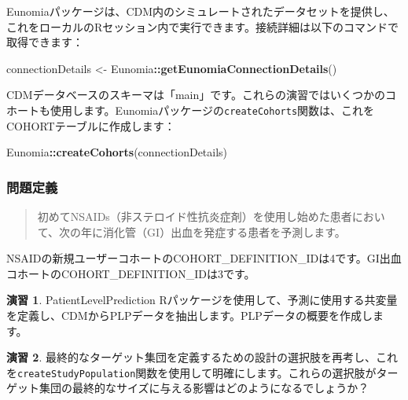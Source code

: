 \documentclass[
  11pt]{book}
\newenvironment{Shaded}{\begin{snugshade}}{\end{snugshade}}
\newcommand{\FunctionTok}[1]{\textcolor[rgb]{0.13,0.29,0.53}{\textbf{#1}}}
\newcommand{\NormalTok}[1]{#1}
\newcommand{\OtherTok}[1]{\textcolor[rgb]{0.56,0.35,0.01}{#1}}
\newcommand{\SpecialCharTok}[1]{\textcolor[rgb]{0.81,0.36,0.00}{\textbf{#1}}}
\theoremstyle{definition}
\theoremstyle{definition}
\theoremstyle{definition}
\newtheorem{exercise}{演習}[chapter]
\theoremstyle{definition}
\theoremstyle{remark}
\begin{document}
Eunomiaパッケージは、CDM内のシミュレートされたデータセットを提供し、これをローカルのRセッション内で実行できます。接続詳細は以下のコマンドで取得できます：

\begin{Shaded}
\begin{Highlighting}[]
\NormalTok{connectionDetails }\OtherTok{\textless{}{-}}\NormalTok{ Eunomia}\SpecialCharTok{::}\FunctionTok{getEunomiaConnectionDetails}\NormalTok{()}
\end{Highlighting}
\end{Shaded}

CDMデータベースのスキーマは「main」です。これらの演習ではいくつかのコホートも使用します。Eunomiaパッケージの\texttt{createCohorts}関数は、これをCOHORTテーブルに作成します：

\begin{Shaded}
\begin{Highlighting}[]
\NormalTok{Eunomia}\SpecialCharTok{::}\FunctionTok{createCohorts}\NormalTok{(connectionDetails)}
\end{Highlighting}
\end{Shaded}

\subsubsection*{問題定義}\label{ux554fux984cux5b9aux7fa9-1}

\begin{quote}
初めてNSAIDs（非ステロイド性抗炎症剤）を使用し始めた患者において、次の年に消化管（GI）出血を発症する患者を予測します。
\end{quote}

NSAIDの新規ユーザーコホートのCOHORT\_DEFINITION\_IDは4です。GI出血コホートのCOHORT\_DEFINITION\_IDは3です。

\begin{exercise}
\protect\hypertarget{exr:exercisePlp1}{}\label{exr:exercisePlp1}PatientLevelPrediction Rパッケージを使用して、予測に使用する共変量を定義し、CDMからPLPデータを抽出します。PLPデータの概要を作成します。
\end{exercise}

\begin{exercise}
\protect\hypertarget{exr:exercisePlp2}{}\label{exr:exercisePlp2}最終的なターゲット集団を定義するための設計の選択肢を再考し、これを\texttt{createStudyPopulation}関数を使用して明確にします。これらの選択肢がターゲット集団の最終的なサイズに与える影響はどのようになるでしょうか？
\end{exercise}
\end{document}
